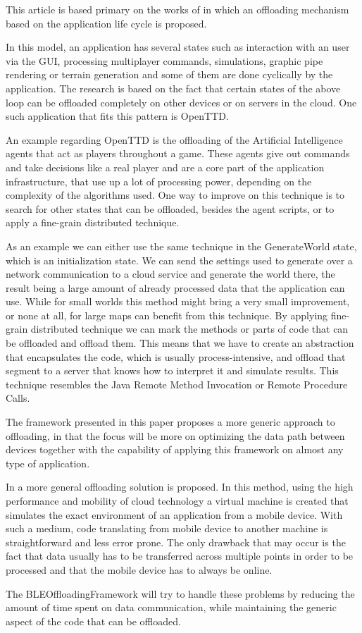 This article is based primary on the works of \cite{olteanu2013extending} in which an offloading mechanism based on the application life cycle is proposed.

In this model, an application has several states such as interaction with an user via the GUI, processing multiplayer commands, simulations, graphic pipe rendering or terrain generation and some of them are done cyclically by the application. The research is based on the fact that certain states of the above loop can be offloaded completely on other devices or on servers in the cloud. One such application that fits this pattern is OpenTTD. 

An example regarding OpenTTD is the offloading of the Artificial Intelligence agents that act as players throughout a game. These agents give out commands and take decisions like a real player and are a core part of the application infrastructure, that use up a lot of processing power, depending on the complexity of the algorithms used. One way to improve on this technique is to search for other states that can be offloaded, besides the agent scripts, or to apply a fine-grain distributed technique. 

As an example we can either use the same technique in the GenerateWorld state, which is an initialization state. We can send the settings used to generate over a network communication to a cloud service and generate the world there, the result being a large amount of already processed data that the application can use. While for small worlds this method might bring a very small improvement, or none at all, for large maps can benefit from this technique. By applying fine-grain distributed technique we can mark the methods or parts of code that can be offloaded and offload them. This means that we have to create an abstraction that encapsulates the code, which is usually process-intensive, and offload that segment to a server that knows how to interpret it and simulate results. This technique resembles the Java Remote Method Invocation or Remote Procedure Calls.

The framework presented in this paper proposes a more generic approach to offloading, in that the focus will be more on optimizing the data path between devices together with the capability of applying this framework on almost any type of application.

In \cite{chun2011clonecloud} a more general offloading solution is proposed. In this method, using the high performance and mobility of cloud technology a virtual machine is created that simulates the exact environment of an application from a mobile device. With such a medium, code translating from mobile device to another machine is straightforward and less error prone. The only drawback that may occur is the fact that data usually has to be transferred across multiple points in order to be processed and that the mobile device has to always be online.

The BLEOffloadingFramework will try to handle these problems by reducing the amount of time spent on data communication, while maintaining the generic aspect of the code that can be offloaded.